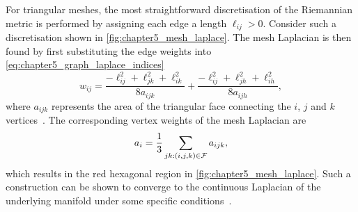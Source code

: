 For triangular meshes, the most straightforward discretisation of the Riemannian metric is performed by assigning each edge a length \(\ell_{i j}>0\).
Consider such a discretisation shown in \cref{fig:chapter5_mesh_laplace}.
The mesh Laplacian is then found by first substituting the edge weights into \cref{eq:chapter5_graph_laplace_indices}
%
\begin{equation}\label{eq:chapter5_mesh_laplace_weights}
	w_{i j}
	= \frac{-\ell_{i j}^{2} + \ell_{j k}^{2} + \ell_{i k}^{2}}{8 a_{i j k}}
	+ \frac{-\ell_{i j}^{2} + \ell_{j h}^{2} + \ell_{i h}^{2}}{8 a_{i j h}},
\end{equation}
%
where \(a_{i j k}\) represents the area of the triangular face connecting the \(i\), \(j\) and \(k\) vertices~\cite{Bronstein2017,Pinkall1993}.
The corresponding vertex weights of the mesh Laplacian are
%
\begin{equation}\label{eq:chapter5_vertex_weight}
	a_{i}
	= \frac{1}{3} \sum\limits_{j k : (i,j,k) \in \mathcal{F}} a_{i j k},
\end{equation}
%
which results in the red hexagonal region in \cref{fig:chapter5_mesh_laplace}.
Such a construction can be shown to converge to the continuous Laplacian of the underlying manifold under some specific conditions~\cite{Wardetzky2008}.

